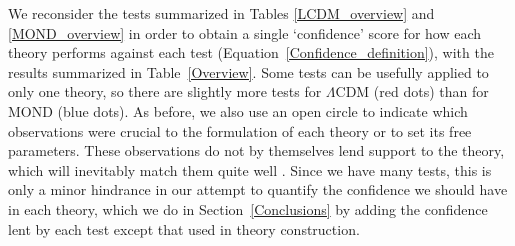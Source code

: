 \documentclass[fleqn,usenatbib,useAMS,onecolumn]{mnras} %
\begin{document}
We reconsider the tests summarized in Tables \ref{LCDM_overview} and \ref{MOND_overview} in order to obtain a single `confidence' score for how each theory performs against each test (Equation~\ref{Confidence_definition}), with the results summarized in Table~\ref{Overview}. Some tests can be usefully applied to only one theory, so there are slightly more tests for $\Lambda$CDM (red dots) than for MOND (blue dots). As before, we also use an open circle to indicate which observations were crucial to the formulation of each theory or to set its free parameters. These observations do not by themselves lend support to the theory, which will inevitably match them quite well \citep{Merritt_2020}. Since we have many tests, this is only a minor hindrance in our attempt to quantify the confidence we should have in each theory, which we do in Section~\ref{Conclusions} by adding the confidence lent by each test except that used in theory construction.
\end{document}
